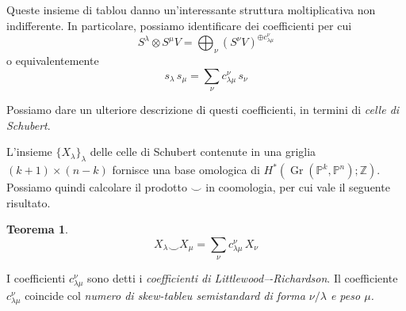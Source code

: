 \documentclass[a4paper, 11pt]{article}
\theoremstyle{definition}
\theoremstyle{plain}
\newtheorem{Teo}[Def]{Teorema}
\newcommand{\PP}{\mathbb{P}}
\newcommand{\Z}{\mathbb{Z}}
\DeclareMathOperator{\Gr}{Gr}
\begin{document}
Queste insieme di tablou danno un'interessante struttura moltiplicativa non indifferente. In particolare, possiamo identificare dei coefficienti per cui 
\[
	S^\lambda \otimes S^\mu V = \bigoplus_{\nu}(S^\nu V)^{\oplus c_{\lambda \mu}^\nu}
\] 
o equivalentemente
\[
	s_\lambda\, s_\mu = \sum_\nu c_{\lambda\mu}^\nu\,s_\nu
\]

Possiamo dare un ulteriore descrizione di questi coefficienti, in termini di \emph{celle di Schubert}. 

L'insieme $\{X_\lambda\}_{\lambda}$ delle celle di Schubert contenute in una griglia $(k+1)\times (n-k)$ fornisce una base omologica di $H^*(\Gr(\PP^k, \PP^n);\Z)$. Possiamo quindi calcolare il prodotto $\smile$ in coomologia, per cui vale il seguente risultato.
\begin{Teo}
	\[
		X_\lambda \smile X_\mu = \sum_\nu c_{\lambda\mu}^\nu\,X_\nu
	\]
\end{Teo}

I coefficienti $c_{\lambda \mu}^\nu$ sono detti i \emph{coefficienti di Littlewood–-Richardson}. Il coefficiente $c_{\lambda\mu}^\nu$ coincide col \emph{numero di  skew-tableu semistandard di forma $\nu/\lambda$ e peso $\mu$.}

\printbibliography[heading=bibintoc]
\end{document}
